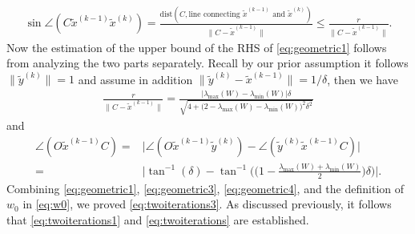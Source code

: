 \documentclass[11pt]{article}
\newcommand{\dist}{\text{dist}}
\begin{document}
{\begin{align}
\sin\angle(C\widetilde{x}^{(k-1)}\widetilde{x}^{(k)})= \frac{\dist(C, \text{line connecting $\widetilde{x}^{(k-1)}$ and $\widetilde{x}^{(k)}$})}{\|C-\widetilde{x}^{(k-1)}\|}\leq \frac{r}{\|C-\widetilde{x}^{(k-1)}\|}.
\label{eq:geometric2}\end{align}
Now the estimation of the upper bound of the RHS of \eqref{eq:geometric1} follows from analyzing the two parts separately. %
Recall by our prior assumption it follows $\|\widetilde{y}^{(k)}\|=1$ and assume in addition $\|\widetilde{y}^{(k)}-\widetilde{x}^{(k-1)}\|=1/\delta$, then we have %
\begin{align}
\frac{r}{\|C - \widetilde{x}^{(k-1)}\|}= \frac{|\lambda_{\max}(W)-\lambda_{\min}(W)|\delta}{\sqrt{4+\big(2-\lambda_{\max}(W)-\lambda_{\min}(W)\big)^2\delta^2}}
\label{eq:geometric3}\end{align}
and %
\begin{align}
\nonumber\angle(O\widetilde{x}^{(k-1)}C)=&\bigg|\angle(O\widetilde{x}^{(k-1)}\widetilde{y}^{(k)})-\angle(\widetilde{y}^{(k)}\widetilde{x}^{(k-1)}C)\bigg|\\
=&\bigg|\tan^{-1}(\delta)-\tan^{-1}\Big(\Big(1-\frac{\lambda_{\max}(W)+\lambda_{\min}(W)}{2}\Big)\delta\Big)\bigg|. 
\label{eq:geometric4}\end{align}
Combining 
\eqref{eq:geometric1}, \eqref{eq:geometric3}, \eqref{eq:geometric4}, and the definition of $w_0$ in \eqref{eq:w0}, we proved \eqref{eq:twoiterations3}. As discussed previously, it follows that
\eqref{eq:twoiterations1} and \eqref{eq:twoiterations} are  established.

}


\end{document}

